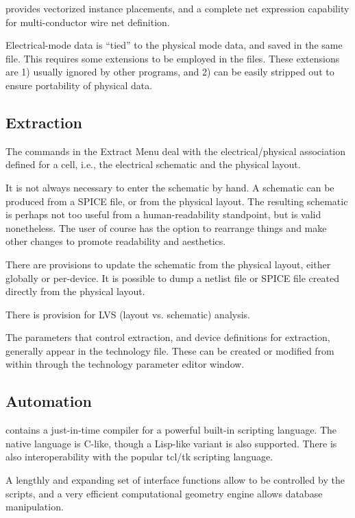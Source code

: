 {\Xic} provides vectorized instance placements, and a complete
net expression capability for multi-conductor wire net definition.

Electrical-mode data is ``tied'' to the physical mode data, and saved
in the same file.  This requires some extensions to be employed in the
files.  These extensions are 1) usually ignored by other programs, and
2) can be easily stripped out to ensure portability of physical data.

\subsection{Extraction}

The commands in the {\cb Extract Menu} deal with the
electrical/physical association defined for a cell, i.e., the
electrical schematic and the physical layout.

It is not always necessary to enter the schematic by hand.  A
schematic can be produced from a SPICE file, or from the physical
layout.  The resulting schematic is perhaps not too useful from a
human-readability standpoint, but is valid nonetheless.  The user of
course has the option to rearrange things and make other changes to
promote readability and aesthetics.

There are provisions to update the schematic from the physical layout,
either globally or per-device.  It is possible to dump a netlist file
or SPICE file created directly from the physical layout.

There is provision for LVS (layout vs. schematic) analysis.

The parameters that control extraction, and device definitions for
extraction, generally appear in the technology file.  These can be
created or modified from within {\Xic} through the technology parameter
editor window.

\subsection{Automation}

{\Xic} contains a just-in-time compiler for a powerful built-in
scripting language.  The native language is C-like, though a Lisp-like
variant is also supported.  There is also interoperability with the
popular tcl/tk scripting language.

A lengthly and expanding set of interface functions allow {\Xic} to be
controlled by the scripts, and a very efficient computational geometry
engine allows database manipulation.


